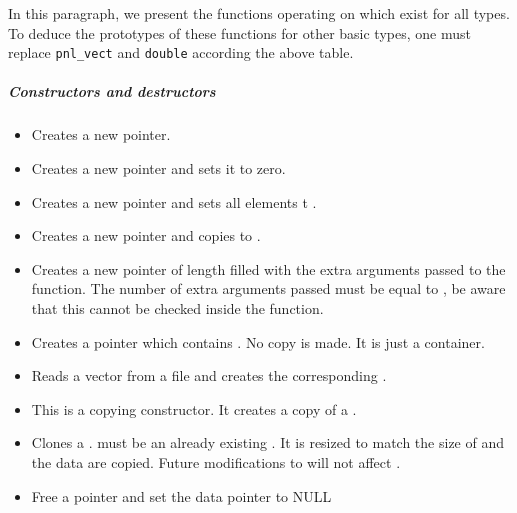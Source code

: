 In this paragraph, we present the functions operating on 
which exist for all types. To deduce the prototypes of these functions for
other basic types, one must replace {\tt pnl_vect} and {\tt double} according
the above table. 
\subparagraph{Constructors and destructors}
\begin{itemize}
\item {}
  \sshortdescribe Creates a new  pointer.  
\item {}
  \sshortdescribe Creates a new  pointer and sets it to zero.  
\item {}
  \sshortdescribe Creates a new  pointer and sets all
  elements t .  
\item {}
  \sshortdescribe Creates a new  pointer and copies 
  to .  
\item {}
  \sshortdescribe Creates a new  pointer of length
   filled with the extra arguments passed to the function. The
  number of extra arguments passed must be equal to , be aware that
  this cannot be checked inside the function.
\item {}
  \sshortdescribe Creates a  pointer which contains
  . No copy is made. It is just a container.
  
\item {}
  \sshortdescribe Reads a vector from a file and creates the corresponding .  

\item {}
  \sshortdescribe This is a copying constructor. It creates a copy of a .
\item {} 
  \sshortdescribe Clones a .  must be an
  already existing  . It is resized to match the size of
   and the data are copied. Future modifications to  will not
  affect .

\item {}
  \sshortdescribe Free a  pointer and set the data pointer to NULL  
\end{itemize}

